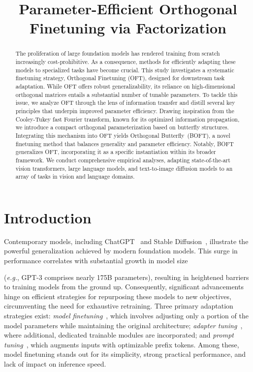 \title{Parameter-Efficient Orthogonal Finetuning via Factorization}

\begin{abstract}
The proliferation of large foundation models has rendered training from scratch increasingly cost-prohibitive. As a consequence, methods for efficiently adapting these models to specialized tasks have become crucial. This study investigates a systematic finetuning strategy, Orthogonal Finetuning (OFT), designed for downstream task adaptation. While OFT offers robust generalizability, its reliance on high-dimensional orthogonal matrices entails a substantial number of tunable parameters. To tackle this issue, we analyze OFT through the lens of information transfer and distill several key principles that underpin improved parameter efficiency. Drawing inspiration from the Cooley-Tukey fast Fourier transform, known for its optimized information propagation, we introduce a compact orthogonal parameterization based on butterfly structures. Integrating this mechanism into OFT yields Orthogonal Butterfly~(BOFT), a novel finetuning method that balances generality and parameter efficiency. Notably, BOFT generalizes OFT, incorporating it as a specific instantiation within its broader framework. We conduct comprehensive empirical analyses, adapting state-of-the-art vision transformers, large language models, and text-to-image diffusion models to an array of tasks in vision and language domains.
\end{abstract}

\section{Introduction}

Contemporary models, including ChatGPT~\cite{brown2020language,chen2021evaluating} and Stable Diffusion~\cite{rombach2022high}, illustrate the powerful generalization achieved by modern foundation models. This surge in performance correlates with substantial growth in model size

(\emph{e.g.}, GPT-3 comprises nearly 175B parameters), resulting in heightened barriers to training models from the ground up. Consequently, significant advancements hinge on efficient strategies for repurposing these models to new objectives, circumventing the need for exhaustive retraining. Three primary adaptation strategies exist: \emph{model finetuning}~\cite{hulora2022,zaken2022bitfit,guo2020parameter,raffel2020exploring,qiu2023controlling,zhang2022adaptive,chavan2023one}, which involves adjusting only a portion of the model parameters while maintaining the original architecture; \emph{adapter tuning}~\cite{rebuffi2017learning,houlsby2019parameter,pfeiffer2020adapterfusion,lin2020exploring,he2021towards}, where additional, dedicated trainable modules are incorporated; and \emph{prompt tuning}~\cite{li2021prefix,lester2021power}, which augments inputs with optimizable prefix tokens. Among these, model finetuning stands out for its simplicity, strong practical performance, and lack of impact on inference speed.

